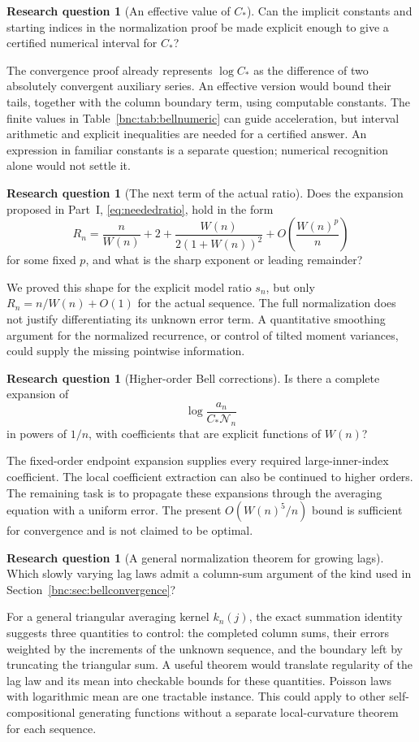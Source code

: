 \documentclass[11pt]{article}
\numberwithin{equation}{section}
\theoremstyle{definition}
\newtheorem{question}[theorem]{Research question}
\theoremstyle{remark}
\begin{document}
\begin{question}[An effective value of \(C_*\)]\label{bnc:q:constant}
Can the implicit constants and starting indices in the normalization
proof be made explicit enough to give a certified numerical interval
for \(C_*\)?
\end{question}
The convergence proof already represents \(\log C_*\) as the
difference of two absolutely convergent auxiliary series.
An effective version would bound their tails, together with the
column boundary term, using computable constants.
The finite values in Table~\ref{bnc:tab:bellnumeric} can guide acceleration,
but interval arithmetic and explicit inequalities are needed for
a certified answer.  An expression in familiar constants is a
separate question; numerical recognition alone would not settle it.

\begin{question}[The next term of the actual ratio]\label{bnc:q:ratio}
Does the expansion proposed in Part~I, \eqref{eq:neededratio}, hold in
the form
\[
 R_n=\frac n{W(n)}+2+\frac{W(n)}{2(1+W(n))^2}
          +O\!\left(\frac{W(n)^p}{n}\right)
\]
for some fixed \(p\), and what is the sharp exponent or leading
remainder?
\end{question}
We proved this shape for the explicit model ratio \(s_n\), but
only \(R_n=n/W(n)+O(1)\) for the actual sequence.
The full normalization does not justify differentiating its
unknown error term.  A quantitative smoothing argument for the
normalized recurrence, or control of tilted moment variances,
could supply the missing pointwise information.

\begin{question}[Higher-order Bell corrections]\label{bnc:q:bellhigher}
Is there a complete expansion of
\[
 \log\frac{a_n}{C_*\mathcal N_n}
\]
in powers of \(1/n\), with coefficients that are explicit functions
of \(W(n)\)?
\end{question}
The fixed-order endpoint expansion supplies every required
large-inner-index coefficient.  The local coefficient extraction
can also be continued to higher orders.  The remaining task is to
propagate these expansions through the averaging equation with a
uniform error.  The present \(O(W(n)^5/n)\) bound is sufficient for
convergence and is not claimed to be optimal.

\begin{question}[A general normalization theorem for growing lags]
Which slowly varying lag laws admit a column-sum argument of the
kind used in Section~\ref{bnc:sec:bellconvergence}?
\end{question}
For a general triangular averaging kernel \(k_n(j)\), the exact
summation identity suggests three quantities to control: the
completed column sums, their errors weighted by the increments
of the unknown sequence, and the boundary left by truncating the
triangular sum.  A useful theorem would translate regularity of
the lag law and its mean into checkable bounds for these quantities.
Poisson laws with logarithmic mean are one tractable instance.
This could apply to other self-compositional generating functions
without a separate local-curvature theorem for each sequence.
\end{document}
